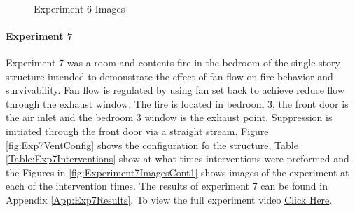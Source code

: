 \documentclass{article}
\begin{document}
\begin{figure}[H]
	\ContinuedFloat 
	\centering 
	 \ 
	\caption{Experiment 6 Images}
	\label{fig:Experiment6ImagesCont4} 
\end{figure}

\paragraph{Experiment 7}\mbox{}

Experiment 7 was a room and contents fire in the bedroom of the single story structure intended to demonstrate the effect of fan flow on fire behavior and survivability. Fan flow is regulated by using fan set back to achieve reduce flow through the exhaust window. The fire is located in bedroom 3, the front door is the air inlet and the bedroom 3 window is the exhaust point. Suppression is initiated through the front door via a straight stream. Figure \ref{fig:Exp7VentConfig} shows the configuration fo the structure, Table \ref{Table:Exp7Interventions} show at what times interventions were preformed and the Figures in \ref{fig:Experiment7ImagesCont1} shows images of the experiment at each of the intervention times. The results of experiment 7 can be found in Appendix \ref{App:Exp7Results}. To view the full experiment video \href{https://youtu.be/PmMNYFz9DYU}{Click Here}.
\end{document}
